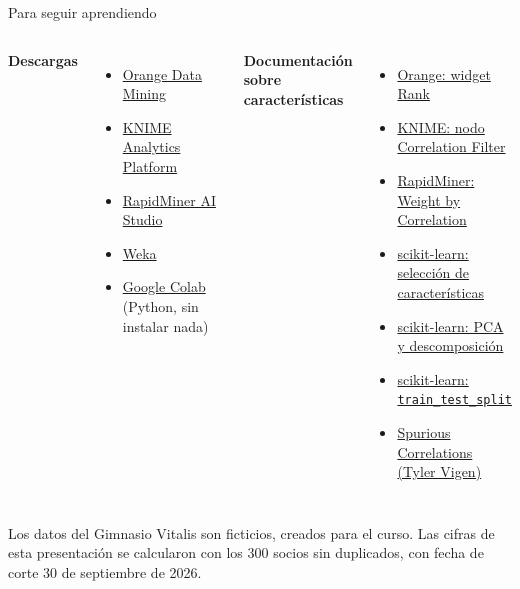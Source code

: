 \documentclass[aspectratio=169,11pt]{beamer}
\newcommand{\urlorange}{https://orangedatamining.com/download/}
\newcommand{\urlorangerank}{https://orangedatamining.com/widget-catalog/data/rank/}
\newcommand{\urlknime}{https://www.knime.com/downloads}
\newcommand{\urlknimecorr}{https://hub.knime.com/knime/extensions/org.knime.features.base/latest/org.knime.base.node.preproc.correlation.filter.CorrelationFilterNodeFactory}
\newcommand{\urlrapid}{https://www.siemens.com/en-us/products/rapidminer/ai-studio/}
\newcommand{\urlrapidcorr}{https://docs.rapidminer.com/latest/studio/operators/modeling/feature_weights/weight_by_correlation.html}
\newcommand{\urlweka}{https://waikato.github.io/weka-wiki/downloading_weka/}
\newcommand{\urlcolab}{https://colab.research.google.com/}
\newcommand{\urlsklearnsel}{https://scikit-learn.org/stable/modules/feature_selection.html}
\newcommand{\urlsklearnpca}{https://scikit-learn.org/stable/modules/decomposition.html}
\newcommand{\urlspurious}{https://tylervigen.com/spurious-correlations}
\newcommand{\urlsplit}{https://scikit-learn.org/stable/modules/generated/sklearn.model_selection.train_test_split.html}
\begin{document}
\begin{frame}[t]{Para seguir aprendiendo}
  \footnotesize
  \begin{columns}[T,onlytextwidth]
    \textbf{Descargas}
    \begin{itemize}
      \footnotesize
      \item \href{\urlorange}{\color{esumerOrange}Orange Data Mining}
      \item \href{\urlknime}{\color{esumerOrange}KNIME Analytics Platform}
      \item \href{\urlrapid}{\color{esumerOrange}RapidMiner AI Studio}
      \item \href{\urlweka}{\color{esumerOrange}Weka}
      \item \href{\urlcolab}{\color{esumerOrange}Google Colab} (Python, sin instalar nada)
    \end{itemize}
    \textbf{Documentación sobre características}
    \begin{itemize}
      \footnotesize
      \item \href{\urlorangerank}{\color{esumerOrange}Orange: widget Rank}
      \item \href{\urlknimecorr}{\color{esumerOrange}KNIME: nodo Correlation Filter}
      \item \href{\urlrapidcorr}{\color{esumerOrange}RapidMiner: Weight by Correlation}
      \item \href{\urlsklearnsel}{\color{esumerOrange}scikit-learn: selección de características}
      \item \href{\urlsklearnpca}{\color{esumerOrange}scikit-learn: PCA y descomposición}
      \item \href{\urlsplit}{\color{esumerOrange}scikit-learn: \texttt{train\_test\_split}}
      \item \href{\urlspurious}{\color{esumerOrange}Spurious Correlations (Tyler Vigen)}
    \end{itemize}
  \end{columns}
  \vspace{0.2cm}
  \scriptsize Los datos del Gimnasio Vitalis son ficticios, creados para el
  curso. Las cifras de esta presentación se calcularon con los 300 socios
  sin duplicados, con fecha de corte 30 de septiembre de 2026.
\end{frame}

{
\begin{frame}
\end{frame}
}
\end{document}
